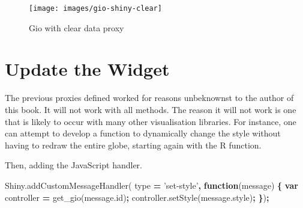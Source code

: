 \documentclass[10pt,]{krantz}
\makeatletter
\newenvironment{Shaded}{\begin{snugshade}}{\end{snugshade}}
\newcommand{\AttributeTok}[1]{\textcolor[rgb]{0.61,0.61,0.61}{#1}}
\newcommand{\CommentTok}[1]{\textcolor[rgb]{0.37,0.37,0.37}{\textit{#1}}}
\newcommand{\ControlFlowTok}[1]{\textcolor[rgb]{0.27,0.27,0.27}{\textbf{#1}}}
\newcommand{\DataTypeTok}[1]{\textcolor[rgb]{0.27,0.27,0.27}{#1}}
\newcommand{\KeywordTok}[1]{\textcolor[rgb]{0.27,0.27,0.27}{\textbf{#1}}}
\newcommand{\NormalTok}[1]{#1}
\newcommand{\OperatorTok}[1]{\textcolor[rgb]{0.43,0.43,0.43}{\textbf{#1}}}
\newcommand{\StringTok}[1]{\textcolor[rgb]{0.5,0.5,0.5}{#1}}
\newcommand{\VariableTok}[1]{\textcolor[rgb]{0,0,0}{#1}}
\newenvironment{kframe}{%
\medskip{}
\setlength{\fboxsep}{.8em}
 \def\at@end@of@kframe{}%
 \ifinner\ifhmode%
  \def\at@end@of@kframe{\end{minipage}}%
  \begin{minipage}{\columnwidth}%
 \fi\fi%
 \def\FrameCommand##1{\hskip\@totalleftmargin \hskip-\fboxsep
 \colorbox{shadecolor}{##1}\hskip-\fboxsep
     \hskip-\linewidth \hskip-\@totalleftmargin \hskip\columnwidth}%
 \MakeFramed {\advance\hsize-\width
   \@totalleftmargin\z@ \linewidth\hsize
   \@setminipage}}%
 {\par\unskip\endMakeFramed%
 \at@end@of@kframe}
\renewenvironment{Shaded}{\begin{kframe}}{\end{kframe}}
\makeatother
\begin{document}
\begin{figure}[H]

{\centering \texttt{[image: images/gio-shiny-clear]} 

}

\caption{Gio with clear data proxy}\label{fig:giod-shiny-clear-data}
\end{figure}

\hypertarget{shiny-widgets-update}{%
\section{Update the Widget}\label{shiny-widgets-update}}

The previous proxies defined worked for reasons unbeknownst to the author of this book. It will not work with all methods. The reason it will not work is one that is likely to occur with many other visualisation libraries. For instance, one can attempt to develop a function to dynamically change the style without having to redraw the entire globe, starting again with the R function.

\begin{Shaded}
\end{Shaded}

Then, adding the JavaScript handler.

\begin{Shaded}
\begin{Highlighting}[]
\VariableTok{Shiny}\NormalTok{.}\AttributeTok{addCustomMessageHandler}\NormalTok{(}
\NormalTok{  type }\OperatorTok{=} \StringTok{'set-style'}\OperatorTok{,} \KeywordTok{function}\NormalTok{(message) }\OperatorTok{\{}
    \KeywordTok{var}\NormalTok{ controller }\OperatorTok{=} \AttributeTok{get_gio}\NormalTok{(}\VariableTok{message}\NormalTok{.}\AttributeTok{id}\NormalTok{)}\OperatorTok{;}
    \VariableTok{controller}\NormalTok{.}\AttributeTok{setStyle}\NormalTok{(}\VariableTok{message}\NormalTok{.}\AttributeTok{style}\NormalTok{)}\OperatorTok{;}
\OperatorTok{\}}\NormalTok{)}\OperatorTok{;}
\end{Highlighting}
\end{Shaded}
\end{document}
